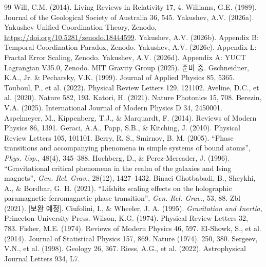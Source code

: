\documentclass[11pt,a4paper]{article}
\begin{document}
\begin{thebibliography}{99}
		 Will, C.M. (2014). Living Reviews in Relativity 17, 4.
		 Williams, G.E. (1989). Journal of the Geological Society of Australia 36, 545.
		 Yakushev, A.V. (2026a). Yakushev Unified Coordination Theory, Zenodo, \url{https://doi.org/10.5281/zenodo.18444599}.
		 Yakushev, A.V. (2026b). Appendix B: Temporal Coordination Paradox, Zenodo.
		 Yakushev, A.V. (2026c). Appendix L: Fractal Error Scaling, Zenodo.
		 Yakushev, A.V. (2026d). Appendix A: YUCT Lagrangian V35.0, Zenodo.
		 MIT Gravity Group (2025). 준비 중.
		 Gschneidner, K.A., Jr. \& Pecharsky, V.K. (1999). Journal of Applied Physics 85, 5365.
		 Touboul, P., et al. (2022). Physical Review Letters 129, 121102.
		 Aveline, D.C., et al. (2020). Nature 582, 193.
		 Katori, H. (2021). Nature Photonics 15, 708.
		 Berezin, V.A. (2025). International Journal of Modern Physics D 34, 2450001.
		 Aspelmeyer, M., Kippenberg, T.J., \& Marquardt, F. (2014). Reviews of Modern Physics 86, 1391.
		 Geraci, A.A., Papp, S.B., \& Kitching, J. (2010). Physical Review Letters 105, 101101.
		 Berry, R. S., Smirnov, B. M. (2005). ``Phase transitions and accompanying phenomena in simple systems of bound atoms'', \textit{Phys. Usp.}, 48(4), 345–388.
		 Hochberg, D., \& Perez-Mercader, J. (1996). ``Gravitational critical phenomena in the realm of the galaxies and Ising magnets'', \textit{Gen. Rel. Grav.}, 28(12), 1427–1432.
		 Binaei Ghotbabadi, B., Sheykhi, A., \& Bordbar, G. H. (2021). ``Lifshitz scaling effects on the holographic paramagnetic-ferromagnetic phase transition'', \textit{Gen. Rel. Grav.}, 53, 88.
		 Zbl (2021). [보완 예정].
		 Ciufolini, I., \& Wheeler, J. A. (1995). \textit{Gravitation and Inertia}, Princeton University Press.
		 Wilson, K.G. (1974). Physical Review Letters 32, 783.
		 Fisher, M.E. (1974). Reviews of Modern Physics 46, 597.
		 El-Showk, S., et al. (2014). Journal of Statistical Physics 157, 869.
		 Nature (1974). 250, 380.
		 Sergeev, V.N., et al. (1998). Geology 26, 367.
		 Riess, A.G., et al. (2022). Astrophysical Journal Letters 934, L7.

\end{thebibliography}
\end{document}
